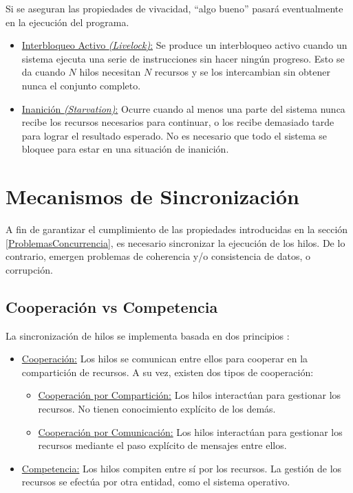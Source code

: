 Si se aseguran las propiedades de vivacidad, ``algo bueno'' pasará eventualmente
en la ejecución del programa.

\begin{itemize}
    \item \underline{Interbloqueo Activo \textit{(Livelock)}:} Se produce un
    interbloqueo activo cuando un sistema ejecuta una serie de instrucciones sin
    hacer ningún progreso. Esto se da cuando $N$ hilos necesitan $N$ recursos
    y se los intercambian sin obtener nunca el conjunto completo.
    \item \underline{Inanición \textit{(Starvation)}:} Ocurre cuando al menos
    una parte del sistema nunca recibe los recursos necesarios para
    continuar, o los recibe demasiado tarde para lograr el resultado
    esperado. No es necesario que todo el sistema se bloquee para estar en una
    situación de inanición.
\end{itemize}

\section{Mecanismos de Sincronización}

A fin de garantizar el cumplimiento de las propiedades introducidas en la
sección \ref{ProblemasConcurrencia}, es necesario sincronizar la ejecución de
los hilos. De lo contrario, emergen problemas de coherencia y/o consistencia de
datos, o corrupción.

\subsection{Cooperación vs Competencia}

La sincronización de hilos se implementa basada en dos principios
\cite{SistOpStallings}:
\begin{itemize}
    \item \underline{Cooperación:} Los hilos se comunican entre ellos para
    cooperar en la compartición de recursos. A su vez, existen dos tipos de
    cooperación:
    \begin{itemize}
        \item \underline{Cooperación por Compartición:} Los hilos interactúan
        para gestionar los recursos. No tienen conocimiento explícito de los demás.
        \item \underline{Cooperación por Comunicación:} Los hilos interactúan
        para gestionar los recursos mediante el paso explícito de mensajes entre
        ellos.
    \end{itemize}
    \item \underline{Competencia:} Los hilos compiten entre sí por los
    recursos. La gestión de los recursos se efectúa por otra entidad, como el
    sistema operativo.
\end{itemize}

